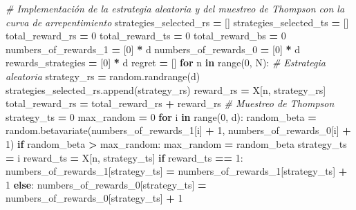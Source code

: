 \documentclass[
]{book}
\newenvironment{Shaded}{\begin{snugshade}}{\end{snugshade}}
\newcommand{\BuiltInTok}[1]{#1}
\newcommand{\CommentTok}[1]{\textcolor[rgb]{0.56,0.35,0.01}{\textit{#1}}}
\newcommand{\ControlFlowTok}[1]{\textcolor[rgb]{0.13,0.29,0.53}{\textbf{#1}}}
\newcommand{\DecValTok}[1]{\textcolor[rgb]{0.00,0.00,0.81}{#1}}
\newcommand{\KeywordTok}[1]{\textcolor[rgb]{0.13,0.29,0.53}{\textbf{#1}}}
\newcommand{\NormalTok}[1]{#1}
\newcommand{\OperatorTok}[1]{\textcolor[rgb]{0.81,0.36,0.00}{\textbf{#1}}}
\begin{document}
\begin{Shaded}
\begin{Highlighting}[]
\CommentTok{\# Implementación de la estrategia aleatoria y del muestreo de Thompson con la curva de arrepentimiento}
\NormalTok{strategies\_selected\_rs }\OperatorTok{=}\NormalTok{ []}
\NormalTok{strategies\_selected\_ts }\OperatorTok{=}\NormalTok{ []}
\NormalTok{total\_reward\_rs }\OperatorTok{=} \DecValTok{0}
\NormalTok{total\_reward\_ts }\OperatorTok{=} \DecValTok{0}
\NormalTok{total\_reward\_bs }\OperatorTok{=} \DecValTok{0}
\NormalTok{numbers\_of\_rewards\_1 }\OperatorTok{=}\NormalTok{ [}\DecValTok{0}\NormalTok{] }\OperatorTok{*}\NormalTok{ d}
\NormalTok{numbers\_of\_rewards\_0 }\OperatorTok{=}\NormalTok{ [}\DecValTok{0}\NormalTok{] }\OperatorTok{*}\NormalTok{ d}
\NormalTok{rewards\_strategies }\OperatorTok{=}\NormalTok{ [}\DecValTok{0}\NormalTok{] }\OperatorTok{*}\NormalTok{ d}
\NormalTok{regret }\OperatorTok{=}\NormalTok{ []}
\ControlFlowTok{for}\NormalTok{ n }\KeywordTok{in} \BuiltInTok{range}\NormalTok{(}\DecValTok{0}\NormalTok{, N):}
    \CommentTok{\# Estrategia aleatoria}
\NormalTok{    strategy\_rs }\OperatorTok{=}\NormalTok{ random.randrange(d)}
\NormalTok{    strategies\_selected\_rs.append(strategy\_rs)}
\NormalTok{    reward\_rs }\OperatorTok{=}\NormalTok{ X[n, strategy\_rs]}
\NormalTok{    total\_reward\_rs }\OperatorTok{=}\NormalTok{ total\_reward\_rs }\OperatorTok{+}\NormalTok{ reward\_rs}
    \CommentTok{\# Muestreo de Thompson}
\NormalTok{    strategy\_ts }\OperatorTok{=} \DecValTok{0}
\NormalTok{    max\_random }\OperatorTok{=} \DecValTok{0}
    \ControlFlowTok{for}\NormalTok{ i }\KeywordTok{in} \BuiltInTok{range}\NormalTok{(}\DecValTok{0}\NormalTok{, d):}
\NormalTok{        random\_beta }\OperatorTok{=}\NormalTok{ random.betavariate(numbers\_of\_rewards\_1[i] }\OperatorTok{+} \DecValTok{1}\NormalTok{,}
\NormalTok{                                         numbers\_of\_rewards\_0[i] }\OperatorTok{+} \DecValTok{1}\NormalTok{)}
        \ControlFlowTok{if}\NormalTok{ random\_beta }\OperatorTok{\textgreater{}}\NormalTok{ max\_random:}
\NormalTok{            max\_random }\OperatorTok{=}\NormalTok{ random\_beta}
\NormalTok{            strategy\_ts }\OperatorTok{=}\NormalTok{ i}
\NormalTok{    reward\_ts }\OperatorTok{=}\NormalTok{ X[n, strategy\_ts]}
    \ControlFlowTok{if}\NormalTok{ reward\_ts }\OperatorTok{==} \DecValTok{1}\NormalTok{:}
\NormalTok{        numbers\_of\_rewards\_1[strategy\_ts] }\OperatorTok{=}\NormalTok{ numbers\_of\_rewards\_1[strategy\_ts] }\OperatorTok{+} \DecValTok{1}
    \ControlFlowTok{else}\NormalTok{:}
\NormalTok{        numbers\_of\_rewards\_0[strategy\_ts] }\OperatorTok{=}\NormalTok{ numbers\_of\_rewards\_0[strategy\_ts] }\OperatorTok{+} \DecValTok{1}

\end{Highlighting}
\end{Shaded}
\end{document}

